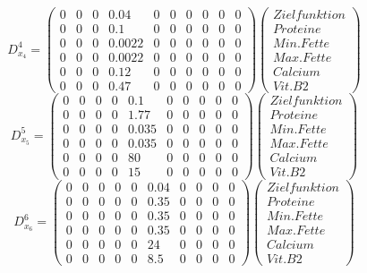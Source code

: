 \documentclass[a4paper,12pt]{article}
\begin{document}
\[
D^4_{x_4} = \begin{pmatrix}
0 & 0 & 0 & 0.04 & 0 & 0 & 0 & 0 & 0 & 0 \\ %
0 & 0 & 0 & 0.1 & 0 & 0 & 0 & 0 & 0 & 0 \\ %
0 & 0 & 0 & 0.0022 & 0 & 0 & 0 & 0 & 0 & 0 \\ %
0 & 0 & 0 & 0.0022 & 0 & 0 & 0 & 0 & 0 & 0 \\ %
0 & 0 & 0 & 0.12 & 0 & 0 & 0 & 0 & 0 & 0 \\ %
0 & 0 & 0 & 0.47 & 0 & 0 & 0 & 0 & 0 & 0 %
\end{pmatrix}
\begin{pmatrix}
    Zielfunktion \\
    Proteine \\
    Min. Fette \\
    Max. Fette \\
    Calcium \\
    Vit. B2
\end{pmatrix}
\]
\[
D^5_{x_5} = \begin{pmatrix}
0 & 0 & 0 & 0 & 0.1 & 0 & 0 & 0 & 0 & 0 \\ %
0 & 0 & 0 & 0 & 1.77 & 0 & 0 & 0 & 0 & 0 \\ %
0 & 0 & 0 & 0 & 0.035 & 0 & 0 & 0 & 0 & 0 \\ %
0 & 0 & 0 & 0 & 0.035 & 0 & 0 & 0 & 0 & 0 \\ %
0 & 0 & 0 & 0 & 80 & 0 & 0 & 0 & 0 & 0 \\ %
0 & 0 & 0 & 0 & 15 & 0 & 0 & 0 & 0 & 0 %
\end{pmatrix}
\begin{pmatrix}
    Zielfunktion \\
    Proteine \\
    Min. Fette \\
    Max. Fette \\
    Calcium \\
    Vit. B2
\end{pmatrix}
\]
\[
D^6_{x_6} = \begin{pmatrix}
0 & 0 & 0 & 0 & 0 & 0.04 & 0 & 0 & 0 & 0 \\ %
0 & 0 & 0 & 0 & 0 & 0.35 & 0 & 0 & 0 & 0 \\ %
0 & 0 & 0 & 0 & 0 & 0.35 & 0 & 0 & 0 & 0 \\ %
0 & 0 & 0 & 0 & 0 & 0.35 & 0 & 0 & 0 & 0 \\ %
0 & 0 & 0 & 0 & 0 & 24 & 0 & 0 & 0 & 0 \\ %
0 & 0 & 0 & 0 & 0 & 8.5 & 0 & 0 & 0 & 0 %
\end{pmatrix}
\begin{pmatrix}
    Zielfunktion \\
    Proteine \\
    Min. Fette \\
    Max. Fette \\
    Calcium \\
    Vit. B2
\end{pmatrix}
\]
\end{document}
